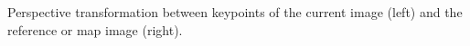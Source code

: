 Perspective transformation between keypoints of the current image (left) and the reference or map image (right).